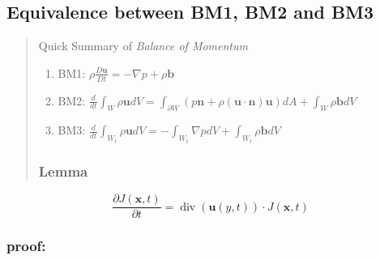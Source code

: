 \subsection{Equivalence between BM1, BM2 and BM3} %


\begin{quote}
	Quick Summary of \textit{Balance of Momentum}
\begin{enumerate}
	\item BM1: $\displaystyle \rho \frac{D\textbf{u}}{Dt} = -\nabla p + \rho \textbf{b}$
	\item BM2: $\displaystyle \frac{d}{dt}\int_{W}\rho \textbf{u} dV = \int_{\partial W} \left(p\textbf{n} + \rho (\textbf{u}\cdot \textbf{n})\textbf{u}\right) dA + \int_{W} \rho \textbf{b} dV$
	\item BM3: $\displaystyle \frac{d}{dt} \int_{W_t} \rho \textbf{u} dV = -\int_{W_t} \nabla pdV + \int_{W_t} \rho \textbf{b}dV$

\end{enumerate}
\subsubsection{Lemma} %

\end{quote}

\begin{equation}
\frac{\partial J(\textbf{x},t)}{\partial t} = \operatorname{div}(\textbf{u}(y,t)) \cdot J(\textbf{x},t)
\end{equation}

\subsubsection{proof:} %


